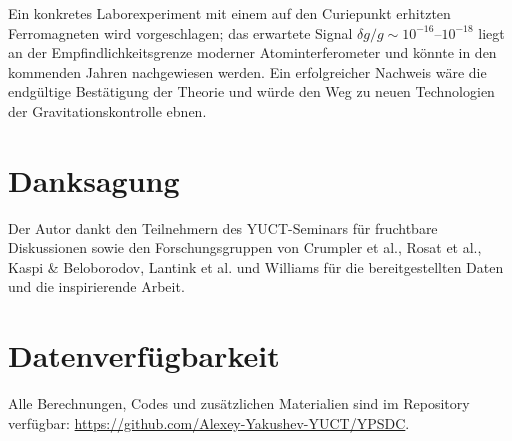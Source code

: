 \documentclass[12pt]{article}
\theoremstyle{remark}
\begin{document}
	Ein konkretes Laborexperiment mit einem auf den Curiepunkt erhitzten Ferromagneten wird vorgeschlagen; das erwartete Signal $\delta g/g \sim 10^{-16}$–$10^{-18}$ liegt an der Empfindlichkeitsgrenze moderner Atominterferometer und könnte in den kommenden Jahren nachgewiesen werden. Ein erfolgreicher Nachweis wäre die endgültige Bestätigung der Theorie und würde den Weg zu neuen Technologien der Gravitationskontrolle ebnen.
	
	\section*{Danksagung}
	Der Autor dankt den Teilnehmern des YUCT-Seminars für fruchtbare Diskussionen sowie den Forschungsgruppen von Crumpler et al., Rosat et al., Kaspi \& Beloborodov, Lantink et al. und Williams für die bereitgestellten Daten und die inspirierende Arbeit.
	
	\section*{Datenverfügbarkeit}
	Alle Berechnungen, Codes und zusätzlichen Materialien sind im Repository verfügbar: \url{https://github.com/Alexey-Yakushev-YUCT/YPSDC}.
	
\end{document}
